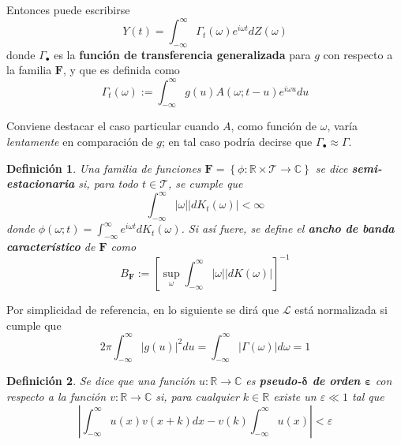 \documentclass[12pt,letterpaper]{book}
\newtheorem{definicion}{Definición}[chapter]
\newcommand{\R}{\mathbb{R}}
\newcommand{\C}{\mathbb{C}}
\newcommand{\intR}{\int_{-\infty}^{\infty}}
\newcommand{\ef}{\mathbf{F}}
\newcommand{\abso}[1]{\left| #1 \right|}
\begin{document}
Entonces puede escribirse 
\begin{equation}
Y(t) = \intR \Gamma_t(\omega) e^{i \omega t} dZ(\omega) 
\label{se6:filtrado}
\end{equation}
donde $\Gamma_\bullet$ es la \textbf{función de transferencia generalizada} para $g$ con respecto a la familia $\ef$, y que es definida como
\begin{equation}
\Gamma_t (\omega) := \intR g(u) A(\omega; t-u) e^{i \omega u} du
\label{se6:trans_general}
\end{equation}

Conviene destacar el caso particular cuando $A$, como función de $\omega$, varía \textit{lentamente} en comparación de $g$; en tal caso podría decirse que $\Gamma_\bullet \approx \Gamma$.

\begin{definicion}
Una familia de funciones $\ef = \left\{ \phi: \R \times \mathcal{T} \rightarrow \C \right\}$ se dice \textbf{semi-estacionaria} si, para todo $t \in \mathcal{T}$, se cumple que
\begin{equation}
\intR \abso{\omega} \abso{dK_t(\omega)} < \infty
\end{equation}
donde $\phi(\omega; t) = \intR e^{i \omega t} dK_t(\omega)$. Si así fuere, se define el \textbf{ancho de banda característico} de $\ef$ como
\begin{equation}
B_\ef := \left[ \sup_\omega \intR \abso{\omega} \abso{dK(\omega)} \right]^{-1}
\end{equation}
\end{definicion}

Por simplicidad de referencia, en lo siguiente se dirá que $\mathcal{L}$ está normalizada si cumple que
\begin{equation}
2 \pi \intR \abso{g(u)}^{2} du = \intR \abso{\Gamma(\omega)} d\omega = 1
\label{s6:norm_g}
\end{equation}

\begin{definicion}
Se dice que una función $u : \R \rightarrow \C$ es \textbf{pseudo-$\boldsymbol{\delta}$ de orden $\boldsymbol{\varepsilon}$} con respecto a la función $v : \R \rightarrow \C$ si, para cualquier $k\in \R$ existe un $\varepsilon \ll 1$ tal que 
\begin{equation}
\abso{\intR u(x) v(x+k) dx  -  v(k)\intR u(x)} < \varepsilon
\end{equation}
\end{definicion}
\end{document}
